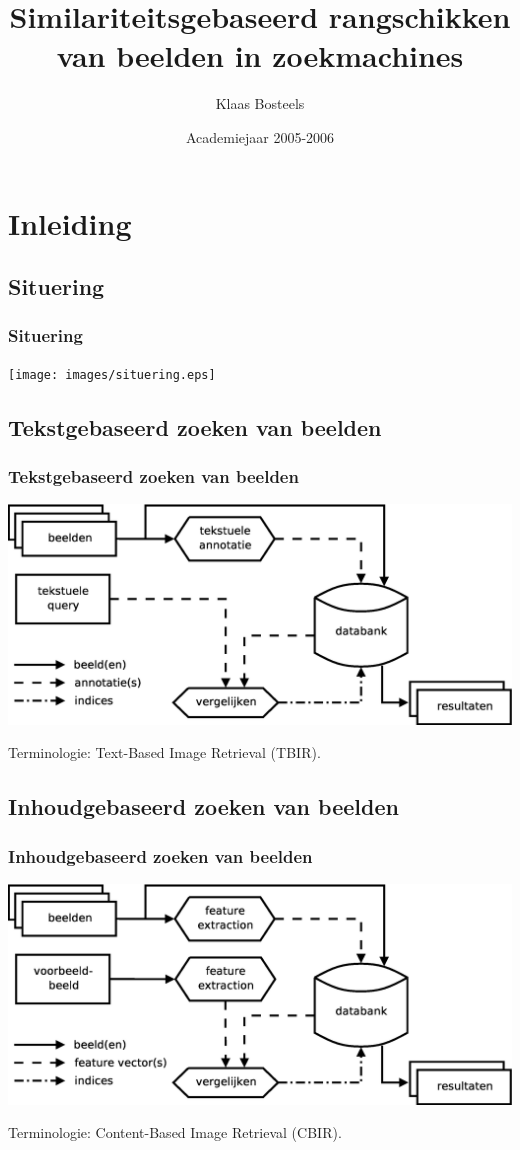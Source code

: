 \documentclass[dutch]{beamer}
\title{Similariteitsgebaseerd rangschikken van beelden in zoekmachines}
\author{Klaas Bosteels}
\date{Academiejaar 2005-2006}
\theoremstyle{definition}
\theoremstyle{remark}
\theoremstyle{example}
\begin{document}
\plainframe{\titlepage}

\section{Inleiding}
\subsection{Situering}
\frame
{
  \frametitle{Situering}
  
  \begin{center}
  \texttt{[image: images/situering.eps]}
  \end{center}
}
\subsection{Tekstgebaseerd zoeken van beelden}
\frame
{
  \frametitle{Tekstgebaseerd zoeken van beelden}

  \begin{center}
  \includegraphics[width=\textwidth]{images/tbir.eps}
  \end{center}

  Terminologie: Text-Based Image Retrieval (TBIR).
}
\subsection{Inhoudgebaseerd zoeken van beelden}
\frame
{
  \frametitle{Inhoudgebaseerd zoeken van beelden}

  \begin{center}
  \includegraphics[width=\textwidth]{images/cbir.eps}
  \end{center}

  Terminologie: Content-Based Image Retrieval (CBIR).
}
\end{document}
